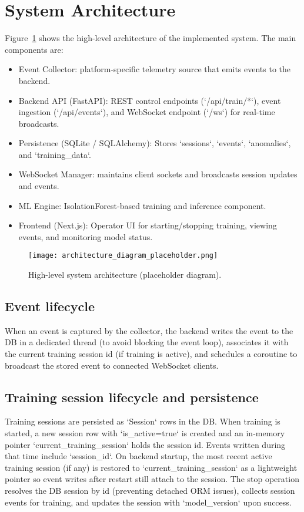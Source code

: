 \documentclass[conference]{IEEEtran}
\begin{document}
\section{System Architecture}
Figure~\ref{fig:arch} shows the high-level architecture of the implemented system. The main components are:
\begin{itemize}[leftmargin=*]
  \item Event Collector: platform-specific telemetry source that emits events to the backend.
  \item Backend API (FastAPI): REST control endpoints (`/api/train/*`), event ingestion (`/api/events`), and WebSocket endpoint (`/ws`) for real-time broadcasts.
  \item Persistence (SQLite / SQLAlchemy): Stores `sessions`, `events`, `anomalies`, and `training_data`.
  \item WebSocket Manager: maintains client sockets and broadcasts session updates and events.
  \item ML Engine: IsolationForest-based training and inference component.
  \item Frontend (Next.js): Operator UI for starting/stopping training, viewing events, and monitoring model status.
\end{itemize}

\begin{figure}[t]
  \centering
  \texttt{[image: architecture\_diagram\_placeholder.png]}
  \caption{High-level system architecture (placeholder diagram).}
  \label{fig:arch}
\end{figure}

\subsection{Event lifecycle}
When an event is captured by the collector, the backend writes the event to the DB in a dedicated thread (to avoid blocking the event loop), associates it with the current training session id (if training is active), and schedules a coroutine to broadcast the stored event to connected WebSocket clients.

\subsection{Training session lifecycle and persistence}
Training sessions are persisted as `Session` rows in the DB. When training is started, a new session row with `is_active=true` is created and an in-memory pointer `current_training_session` holds the session id. Events written during that time include `session_id`. On backend startup, the most recent active training session (if any) is restored to `current_training_session` as a lightweight pointer so event writes after restart still attach to the session. The stop operation resolves the DB session by id (preventing detached ORM issues), collects session events for training, and updates the session with `model_version` upon success.
\end{document}
